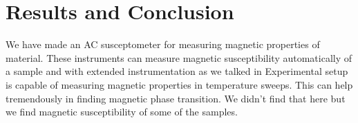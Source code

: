 \section{Results and Conclusion}

We have made an AC susceptometer for measuring magnetic properties of material. These instruments can measure magnetic susceptibility automatically of a sample and with extended instrumentation as we talked in Experimental setup is capable of measuring magnetic properties in temperature sweeps. This can help tremendously in finding magnetic phase transition. We didn’t find that here but we find magnetic susceptibility of some of the samples.

